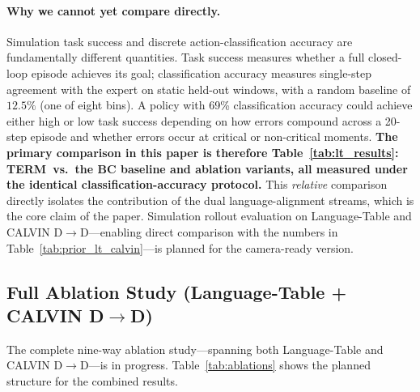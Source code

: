 \documentclass{article}
\newcommand{\modelname}{\textsc{TERM}\xspace}
\begin{document}
\paragraph{Why we cannot yet compare directly.}
Simulation task success and discrete action-classification accuracy are
fundamentally different quantities.
Task success measures whether a full closed-loop episode achieves its goal;
classification accuracy measures single-step agreement with the expert on
static held-out windows, with a random baseline of $12.5\%$ (one of eight bins).
A policy with 69\% classification accuracy could achieve either high or low
task success depending on how errors compound across a 20-step episode and
whether errors occur at critical or non-critical moments.
\textbf{The primary comparison in this paper is therefore Table~\ref{tab:lt_results}:
\modelname\ vs.\ the BC baseline and ablation variants, all measured under
the identical classification-accuracy protocol.}
This \emph{relative} comparison directly isolates the contribution of the
dual language-alignment streams, which is the core claim of the paper.
Simulation rollout evaluation on Language-Table and CALVIN D$\to$D---enabling
direct comparison with the numbers in Table~\ref{tab:prior_lt_calvin}---is
planned for the camera-ready version.

\subsection{Full Ablation Study (Language-Table + CALVIN D$\to$D)}
\label{sec:ablation_extended}

The complete nine-way ablation study—spanning both Language-Table and
CALVIN D$\to$D—is in progress.
Table~\ref{tab:ablations} shows the planned structure for the combined results.
\end{document}
